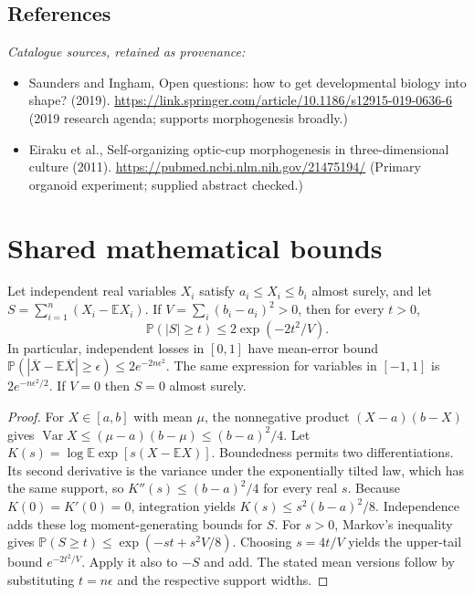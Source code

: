 \documentclass[11pt]{article}
\begin{document}
\subsection{References}
\noindent\emph{Catalogue sources, retained as provenance:}
\begin{itemize}
\item Saunders and Ingham, Open questions: how to get developmental biology into shape? (2019). \url{https://link.springer.com/article/10.1186/s12915-019-0636-6} (2019 research agenda; supports morphogenesis broadly.)
\item Eiraku et al., Self-organizing optic-cup morphogenesis in three-dimensional culture (2011). \url{https://pubmed.ncbi.nlm.nih.gov/21475194/} (Primary organoid experiment; supplied abstract checked.)
\end{itemize}




\section{Shared mathematical bounds}\label{app:bounds}
\begin{lemma}\label{lem:bounded}
Let independent real variables $X_i$ satisfy $a_i\leq X_i\leq b_i$ almost surely,
and let $S=\sum_{i=1}^n(X_i-\mathbb{E} X_i)$. If
$V=\sum_i(b_i-a_i)^2>0$, then for every $t>0$,
\[
 \mathbb{P}(|S|\geq t)\leq 2\exp(-2t^2/V).
\]
In particular, independent losses in $[0,1]$ have mean-error bound
$\mathbb{P}(|\overline X-\mathbb{E}\overline X|\geq\epsilon)
\leq2e^{-2n\epsilon^2}$. The same expression for variables in $[-1,1]$
is $2e^{-n\epsilon^2/2}$. If $V=0$ then $S=0$ almost surely.
\end{lemma}
\begin{proof}
For $X\in[a,b]$ with mean $\mu$, the nonnegative product
$(X-a)(b-X)$ gives
$\operatorname{Var} X\leq(\mu-a)(b-\mu)\leq(b-a)^2/4$.
Let $K(s)=\log\mathbb{E}\exp[s(X-\mathbb{E} X)]$.
Boundedness permits two differentiations. Its second derivative is the variance
under the exponentially tilted law, which has the same support, so
$K''(s)\leq(b-a)^2/4$ for every real $s$.
Because $K(0)=K'(0)=0$, integration yields
$K(s)\leq s^2(b-a)^2/8$.
Independence adds these log moment-generating bounds for $S$.
For $s>0$, Markov's inequality gives
$\mathbb{P}(S\geq t)\leq\exp(-st+s^2V/8)$.
Choosing $s=4t/V$ yields the upper-tail bound $e^{-2t^2/V}$.
Apply it also to $-S$ and add. The stated mean versions follow by substituting
$t=n\epsilon$ and the respective support widths.
\end{proof}
\end{document}
